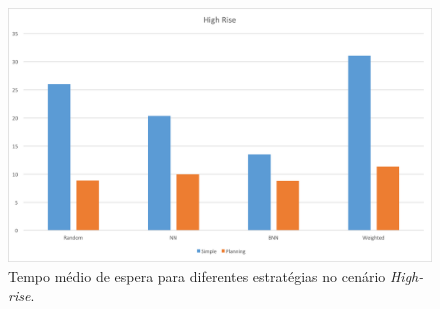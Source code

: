 \begin{figure}[htb]
  \centering
  \includegraphics[scale=0.5]{img/chart-averages-high-rise}
  \caption[Tempo médio de espera no cenário \textit{High-rise}.]{Tempo médio de espera para diferentes estratégias no cenário \textit{High-rise}.}
  \label{fig:result:average:high-rise}
\end{figure}